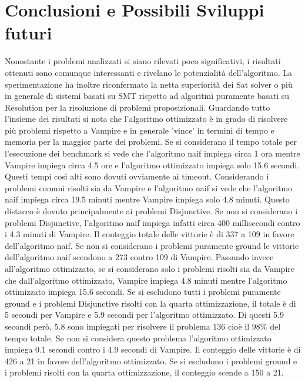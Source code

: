 \documentclass[./main.tex]{subfiles}
\begin{document}


\section{Conclusioni e Possibili Sviluppi futuri}
Nonostante i problemi analizzati si siano rilevati poco significativi, 
i risultati ottenuti sono comunque interessanti e rivelano le potenzialità dell'algoritmo.
La sperimentazione ha inoltre riconfermato la netta superiorità dei Sat solver o più in generale di sistemi 
basati su SMT rispetto ad algoritmi puramente basati su Resolution per la risoluzione di problemi proposizionali.
Guardando tutto l'insieme dei risultati si nota che l'algoritmo ottimizzato è in grado di risolvere più problemi rispetto a Vampire 
e in generale 'vince' in termini di tempo e memoria per la maggior parte dei problemi.
Se si considerano il tempo totale per l'esecuzione dei benchmark si vede che l'algoritmo naif impiega circa 1 ora 
mentre Vampire impiega circa 4.5 ore e l'algoritmo ottimizzato impiega solo 15.6 secondi.
Questi tempi così alti sono dovuti ovviamente ai timeout.
Considerando i problemi comuni risolti sia da Vampire e l'algoritmo naif si vede che l'algoritmo naif impiega
circa 19.5 minuti mentre Vampire impiega solo 4.8 minuti. 
Questo distacco è dovuto principalmente ai problemi Disjunctive. 
Se non si considerano i problemi Disjunctive, l'algoritmo naif impiega infatti circa 400 millisecondi contro i 4.3 minuti di Vampire.
Il conteggio totale delle vittorie è di 337 a 109 in favore dell'algoritmo naif.
Se non si considerano i problemi puramente ground le vittorie dell'algoritmo naif scendono a 273 contro 109 di Vampire.
Passando invece all'algoritmo ottimizzato, se si considerano solo i problemi risolti sia da Vampire che dall'algoritmo ottimizzato,
Vampire impiega 4.8 minuti mentre l'algoritmo ottimizzato impiega 15.6 secondi.
Se si escludono tutti i problemi puramente ground e i problemi Disjunctive risolti con la quarta ottimizzazione,
il totale è di 5 secondi per Vampire e 5.9 secondi per l'algoritmo ottimizzato.
Di questi 5.9 secondi però, 5.8 sono impiegati per risolvere il problema 136 cioè il $98\%$ del tempo totale.  
Se non si considera questo problema l'algoritmo ottimizzato impiega 0.1 secondi contro i 4.9 secondi di Vampire.
Il conteggio delle vittorie è di 426 a 21 in favore dell'algoritmo ottimizzato. 
Se si escludono i problemi ground e i problemi risolti con la quarta ottimizzazione, il conteggio scende a 150 a 21.
\end{document}

